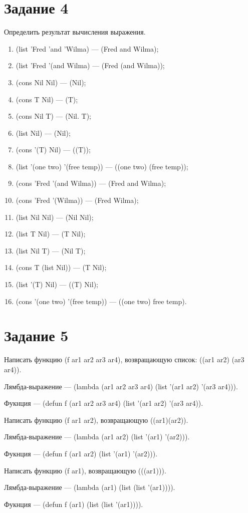 \section{Задание 4}
Определить результат вычисления выражения.
\begin{enumerate}
\item (list 'Fred 'and 'Wilma) --- (Fred and Wilma);
\item (list 'Fred '(and Wilma) --- (Fred (and Wilma));
\item (cons Nil Nil) --- (Nil);
\item (cons T Nil) --- (T);
\item (cons Nil T) --- (Nil. T);
\item (list Nil) --- (Nil);
\item (cons '(T) Nil) --- ((T));
\item (list '(one two) '(free temp)) --- ((one two) (free temp));
\item (cons 'Fred '(and Wilma)) --- (Fred and Wilma);
\item (cons 'Fred '(Wilma)) --- (Fred Wilma);
\item (list Nil Nil) --- (Nil Nil);
\item (list T Nil) --- (T Nil);
\item (list Nil T) --- (Nil T);
\item (cons T (list Nil)) --- (T Nil);
\item (list '(T) Nil) --- ((T) Nil);
\item (cons '(one two) '(free temp)) --- ((one two) free temp).
\end{enumerate}

\section{Задание 5}
Написать функцию (f ar1 ar2 ar3 ar4), возвращающую список: ((ar1 ar2) (ar3 ar4)).

Лямбда-выражение --- (lambda (ar1 ar2 ar3 ar4) (list '(ar1 ar2) '(ar3 ar4))).

Фукнция --- (defun f (ar1 ar2 ar3 ar4) (list '(ar1 ar2) '(ar3 ar4)).
\begin{figure}[H]
\end{figure}

Написать функцию (f ar1 ar2), возвращающую ((ar1)(ar2)).

Лямбда-выражение --- (lambda (ar1 ar2) (list '(ar1) '(ar2))).

Фукнция --- (defun f (ar1 ar2) (list '(ar1) '(ar2))).
\begin{figure}[H]
\end{figure}

\newpage
Написать функцию (f ar1), возвращающую (((ar1))).

Лямбда-выражение --- (lambda (ar1) (list (list '(ar1)))).

Фукнция --- (defun f (ar1) (list (list '(ar1)))).
\begin{figure}[H]
\end{figure}